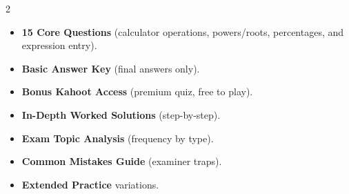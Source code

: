\documentclass[11pt,a4paper]{article}
\newcommand{\FullReleaseDate}{April 30, 2026}
\begin{document}
\vspace{8pt}

\begin{multicols}{2}
  \begin{tcolorbox}[card, title=\sffamily\bfseries\textcolor{white}{\faHandPointDown\ TODAY (Simplified Version)}, colbacktitle=mainblue, boxed title style={sharp corners, boxrule=0pt}]
    \begin{itemize}[leftmargin=1.2em, itemsep=2pt]
      \item \small \textbf{15 Core Questions} (calculator operations, powers/roots, percentages, and expression entry).
      \item \small \textbf{Basic Answer Key} (final answers only).
      \item \small \textbf{Bonus Kahoot Access} (premium quiz, free to play).
    \end{itemize}
  \end{tcolorbox}

  \columnbreak

  \begin{tcolorbox}[card, title=\sffamily\bfseries\textcolor{white}{\faRocket\ ON \FullReleaseDate\ (Full Upgrade)}, colbacktitle=mainblue, boxed title style={sharp corners, boxrule=0pt}]
    \begin{itemize}[leftmargin=1.2em, itemsep=2pt]
      \item \small \textbf{In-Depth Worked Solutions} (step-by-step).
      \item \small \textbf{Exam Topic Analysis} (frequency by type).
      \item \small \textbf{Common Mistakes Guide} (examiner traps).
      \item \small \textbf{Extended Practice} variations.
    \end{itemize}
  \end{tcolorbox}
\end{multicols}
\end{document}
